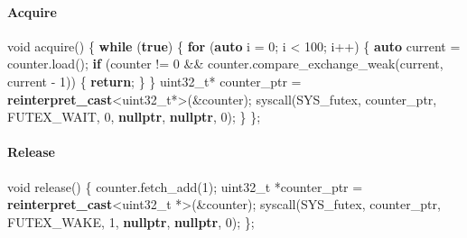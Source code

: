 \documentclass[
]{article}
\newenvironment{Shaded}{}{}
\newcommand{\ControlFlowTok}[1]{\textcolor[rgb]{0.00,0.44,0.13}{\textbf{#1}}}
\newcommand{\DataTypeTok}[1]{\textcolor[rgb]{0.56,0.13,0.00}{#1}}
\newcommand{\DecValTok}[1]{\textcolor[rgb]{0.25,0.63,0.44}{#1}}
\newcommand{\KeywordTok}[1]{\textcolor[rgb]{0.00,0.44,0.13}{\textbf{#1}}}
\newcommand{\NormalTok}[1]{#1}
\newcommand{\OperatorTok}[1]{\textcolor[rgb]{0.40,0.40,0.40}{#1}}
\begin{document}
\paragraph{Acquire}\label{acquire-1}

\begin{Shaded}
\begin{Highlighting}[]
\DataTypeTok{void}\NormalTok{ acquire}\OperatorTok{()} \OperatorTok{\{}
  \ControlFlowTok{while} \OperatorTok{(}\KeywordTok{true}\OperatorTok{)} \OperatorTok{\{}
    \ControlFlowTok{for} \OperatorTok{(}\KeywordTok{auto}\NormalTok{ i }\OperatorTok{=} \DecValTok{0}\OperatorTok{;}\NormalTok{ i }\OperatorTok{\textless{}} \DecValTok{100}\OperatorTok{;}\NormalTok{ i}\OperatorTok{++)} \OperatorTok{\{}
      \KeywordTok{auto}\NormalTok{ current }\OperatorTok{=}\NormalTok{ counter}\OperatorTok{.}\NormalTok{load}\OperatorTok{();}
      \ControlFlowTok{if} \OperatorTok{(}\NormalTok{counter }\OperatorTok{!=} \DecValTok{0} \OperatorTok{\&\&}\NormalTok{ counter}\OperatorTok{.}\NormalTok{compare\_exchange\_weak}\OperatorTok{(}\NormalTok{current}\OperatorTok{,}\NormalTok{ current }\OperatorTok{{-}} \DecValTok{1}\OperatorTok{))} \OperatorTok{\{}
          \ControlFlowTok{return}\OperatorTok{;}
      \OperatorTok{\}}
    \OperatorTok{\}}
    \DataTypeTok{uint32\_t}\OperatorTok{*}\NormalTok{ counter\_ptr }\OperatorTok{=} \KeywordTok{reinterpret\_cast}\OperatorTok{\textless{}}\DataTypeTok{uint32\_t}\OperatorTok{*\textgreater{}(\&}\NormalTok{counter}\OperatorTok{);}
\NormalTok{    syscall}\OperatorTok{(}\NormalTok{SYS\_futex}\OperatorTok{,}\NormalTok{ counter\_ptr}\OperatorTok{,}\NormalTok{ FUTEX\_WAIT}\OperatorTok{,} \DecValTok{0}\OperatorTok{,} \KeywordTok{nullptr}\OperatorTok{,} \KeywordTok{nullptr}\OperatorTok{,} \DecValTok{0}\OperatorTok{);}
  \OperatorTok{\}}
\OperatorTok{\};}
\end{Highlighting}
\end{Shaded}

\paragraph{Release}\label{release-1}

\begin{Shaded}
\begin{Highlighting}[]
\DataTypeTok{void}\NormalTok{ release}\OperatorTok{()} \OperatorTok{\{}
\NormalTok{  counter}\OperatorTok{.}\NormalTok{fetch\_add}\OperatorTok{(}\DecValTok{1}\OperatorTok{);}
  \DataTypeTok{uint32\_t} \OperatorTok{*}\NormalTok{counter\_ptr }\OperatorTok{=} \KeywordTok{reinterpret\_cast}\OperatorTok{\textless{}}\DataTypeTok{uint32\_t} \OperatorTok{*\textgreater{}(\&}\NormalTok{counter}\OperatorTok{);}
\NormalTok{  syscall}\OperatorTok{(}\NormalTok{SYS\_futex}\OperatorTok{,}\NormalTok{ counter\_ptr}\OperatorTok{,}\NormalTok{ FUTEX\_WAKE}\OperatorTok{,} \DecValTok{1}\OperatorTok{,} \KeywordTok{nullptr}\OperatorTok{,} \KeywordTok{nullptr}\OperatorTok{,} \DecValTok{0}\OperatorTok{);}
\OperatorTok{\};}
\end{Highlighting}
\end{Shaded}
\end{document}
